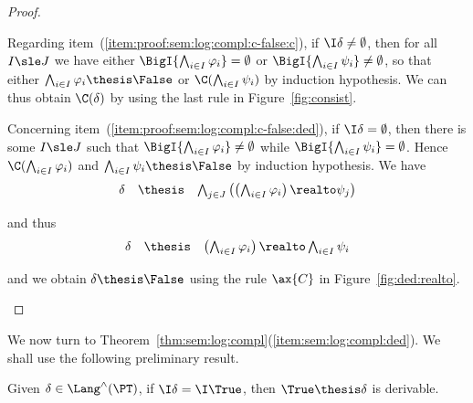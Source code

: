 \begin{proof}
\begin{description}
Regarding item~(\ref{item:proof:sem:log:compl:c-false:c}),
if $\I\delta \neq \emptyset$,
then for all $I \sle J$ we have either
$\BigI{\bigwedge_{i \in I} \varphi_i} = \emptyset$
or
$\BigI{\bigwedge_{i \in I} \psi_i} \neq \emptyset$,
so that either
$\bigwedge_{i \in I} \varphi_i \thesis \False$
or
$\C(\bigwedge_{i \in I} \psi_i)$
by induction hypothesis.
We can thus obtain $\C(\delta)$ by using the last rule in
Figure~\ref{fig:consist}.

Concerning item~(\ref{item:proof:sem:log:compl:c-false:ded}),
if $\I\delta = \emptyset$,
then there is some $I \sle J$
such that
$\BigI{\bigwedge_{i \in I} \varphi_i} \neq \emptyset$
while
$\BigI{\bigwedge_{i \in I} \psi_i} = \emptyset$.
Hence
$\C(\bigwedge_{i \in I} \varphi_i)$
and
$\bigwedge_{i \in I} \psi_i \thesis \False$
by induction hypothesis.
%
We have
\[
\begin{array}{l l l}
  \delta
& \thesis
& \bigwedge_{j \in J}
  \left(
  \left( \bigwedge_{i \in I} \varphi_i \right)
  \realto
  \psi_j
  \right)
\end{array}
\]

\noindent
and thus
\[
\begin{array}{l l l}
  \delta
& \thesis
& \left( \bigwedge_{i \in I} \varphi_i \right)
  \realto
  \bigwedge_{i \in I} \psi_i
\end{array}
\]

\noindent
and we obtain $\delta \thesis \False$ using the rule $\ax{C}$
in Figure~\ref{fig:ded:realto}.
\qedhere
\end{description}
\end{proof}

We now turn to Theorem~\ref{thm:sem:log:compl}(\ref{item:sem:log:compl:ded}).
We shall use the following preliminary result.

\begin{lemma}
\label{lem:proof:sem:log:compl:true}
Given $\delta \in \Lang^\land(\PT)$,
if $\I\delta = \I\True$,
then $\True \thesis \delta$ is derivable.
\end{lemma}


